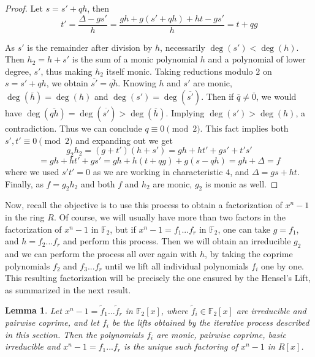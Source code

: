 \documentclass[a4paper, 12pt]{amsart}
\newtheorem{lemma}{Lemma}[section]
\theoremstyle{definition}
\newcommand{\F}{{\mathbb F}}
\numberwithin{equation}{section}
\numberwithin{table}{section}
\begin{document}
\begin{proof}
    Let $s = s' +qh$, then
    \[t' = \frac{\Delta-gs'}{h} = \frac{gh + g(s'+qh) + ht-gs'}{h}=t+qg\]
    
    As $s'$ is the remainder after division by $h$, necessarily $\deg(s')<\deg(h)$. Then $h_2 = h+s'$ is the sum of a monic polynomial $h$ and a polynomial of lower degree, $s'$, thus making $h_2$ itself monic.
    Taking reductions modulo $2$ on $s = s' + qh$, we obtain $\overline{s'}=\overline{qh}$. Knowing $h$ and $s'$ are monic, $\deg(\overline h)=\deg(h)$ and $\deg(s') = \deg(\overline{s'})$. Then if $\overline q \neq \overline 0$, we would have $\deg(\overline{qh})=\deg(\overline{s'})> \deg(\overline{h})$. Implying $\deg(s')>\deg(h)$, a contradiction.
    Thus we can conclude $q \equiv 0 \pmod 2$. This fact implies both $s',t' \equiv 0 \pmod 2$ and expanding out we get
    \[g_2h_2 = (g+t')(h+s') = gh +ht'+gs' +t's'\]
    \[=gh +ht'+gs' =gh + h(t+qg)+g(s-qh) = gh + \Delta = f\]
    where we used $s't' = 0$ as we are working in characteristic $4$, and $\Delta =gs+ht$.
    Finally, as $f =g_2h_2$ and both $f$ and $h_2$ are monic, $g_2$ is monic as well.
    
    
\end{proof}

Now, recall the objective is to use this process to obtain a factorization of $x^n-1$ in the ring $R$. Of course, we will usually have more than two factors in the factorization of $x^n-1$ in $\F_2$, but if $x^n-1 = f_1...f_r$ in $\F_2$, one can take $g = f_1$, and $h=f_2...f_r$ and perform this process. Then we will obtain an irreducible $g_2$ and we can perform the process all over again with $h$, by taking the coprime polynomials $f_2$ and $f_3...f_r$ until we lift all individual polynomials $f_i$ one by one. This resulting factorization will be precisely the one ensured by the Hensel's Lift, as summarized in the next result.


\begin{lemma}\label{liftingthmyes}
    Let $x^n-1 = \tilde f_1...\tilde f_r$ in $\F_2[x]$, where $\tilde f_i \in \F_2[x]$ are irreducible and pairwise coprime, and let $f_i$ be the lifts obtained by the iterative process described in this section. Then the polynomials $f_i$ are monic, pairwise coprime, basic irreducible and $x^n-1 = f_1...f_r$ is the unique such factoring of $x^n-1$ in $R[x]$.
\end{lemma}
\end{document}
